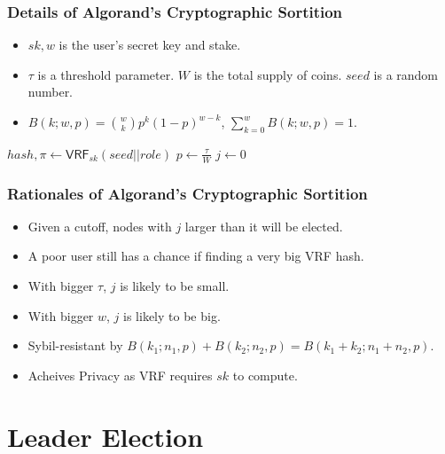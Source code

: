\documentclass{beamer}
\begin{document}
\begin{frame}
\frametitle{Details of Algorand's Cryptographic Sortition}

\begin{itemize}
    \item $sk, w$ is the user's secret key and stake.
    \item $\tau$ is a threshold parameter. $W$ is the total supply of coins. $seed$ is a random number.
    \item $B(k; w, p) = {w \choose k} p^k (1-p)^{w-k}$, $\sum_{k=0}^w B(k; w, p) = 1$.
\end{itemize}

\begin{algorithm}[H]
    \DontPrintSemicolon
    $hash, \pi \gets \mathsf{VRF}_{sk}(seed || role)$\;
    $p \gets \frac{\tau}{W}$\;
    $j \gets 0$\;
    \While{$\frac{hash}{2^{hashlen}} \notin \left[ \sum_{k=0}^j B(k;w,p), \sum_{k=0}^{j+1} B(k;w,p) \right)$}{
        $j++$\;
    }
    \caption{$\mathsf{Sortition}(sk, seed, \tau, role, w, W)$}
\end{algorithm}

\end{frame}

\begin{frame}
\frametitle{Rationales of Algorand's Cryptographic Sortition}
    
\begin{itemize}
    \item Given a cutoff, nodes with $j$ larger than it will be elected.
    \item A poor user still has a chance if finding a very big VRF hash.
    \item With bigger $\tau$, $j$ is likely to be small.
    \item With bigger $w$, $j$ is likely to be big.
    \item Sybil-resistant by $B(k_1;n_1,p) + B(k_2;n_2,p) = B(k_1 + k_2;n_1 + n_2,p)$.
    \item Acheives Privacy as VRF requires $sk$ to compute.
\end{itemize}

\end{frame}





\section{Leader Election}
\end{document}
